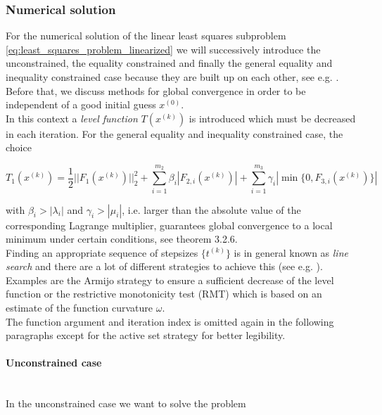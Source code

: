 \documentclass{scrartcl}[12pt, halfparskip]
\numberwithin{equation}{section}
\numberwithin{figure}{section}
\numberwithin{table}{section}
\begin{document}
\subsubsection{Numerical solution}
\label{sec:GN_numerical_solution}

For the numerical solution of the linear least squares subproblem \cref{eq:least_squares_problem_linearized} we will successively introduce the unconstrained, the equality constrained and finally the general equality and inequality constrained case because they are built up on each other, see e.g. \cite{numerical_methods_lsq_Bjorck}. Before that, we discuss methods for global convergence in order to be independent of a good initial guess $x^{(0)}$. \\
In this context a \textit{level function} $T(x^{(k)})$ is introduced which must be decreased in each iteration. For the general equality and inequality constrained case, the choice

\begin{equation}
	T_1(x^{(k)}) = \frac{1}{2} || F_1(x^{(k)}) ||_2^2 + \sum_{i=1}^{m_2} \beta_i | F_{2,i}(x^{(k)}) | + \sum_{i=1}^{m_3} \gamma_i | \min\{0,F_{3,i}(x^{(k)})\} |
\end{equation}

with $\beta_i > |\lambda_i|$ and $\gamma_i > |\mu_i|$, i.e. larger than the absolute value of the corresponding Lagrange multiplier, guarantees global convergence to a local minimum under certain conditions, see \cite{diss_bock} theorem 3.2.6. \\
Finding an appropriate sequence of stepsizes $\{ t^{(k)} \}$ is in general known as \textit{line search} and there are a lot of different strategies to achieve this (see e.g. \cite{nonlinear_optimiziation_wright}). Examples are the Armijo strategy to ensure a sufficient decrease of the level function or the restrictive monotonicity test (RMT) \cite{bock2000_RMT} which is based on an estimate of the function curvature $\omega$. \\

The function argument and iteration index is omitted again in the following paragraphs except for the active set strategy for better legibility.

\paragraph{Unconstrained case}\mbox{}\\
In the unconstrained case we want to solve the problem
\end{document}
